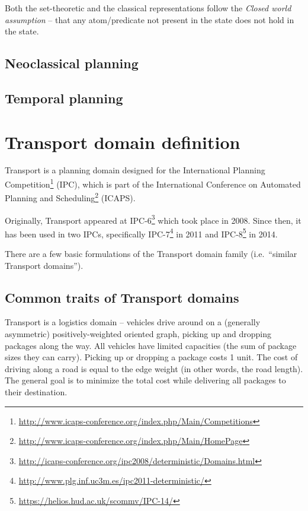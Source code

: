 Both the set-theoretic and the classical representations follow the \textit{Closed world assumption} -- that any atom/predicate not present in the state does not hold in the state.

\subsection{Neoclassical planning}



\subsection{Temporal planning}



\section{Transport domain definition}

Transport is a planning domain designed for
the International Planning
Competition\footnote{\url{http://www.icaps-conference.org/index.php/Main/Competitions}}
(IPC), which is part of the International Conference on Automated Planning and
Scheduling\footnote{\url{http://www.icaps-conference.org/index.php/Main/HomePage}} (ICAPS).

Originally, Transport appeared at 
IPC-6\footnote{\url{http://icaps-conference.org/ipc2008/deterministic/Domains.html}} which took place in 2008.
Since then, it has been used in two IPCs,
specifically IPC-7\footnote{\url{http://www.plg.inf.uc3m.es/ipc2011-deterministic/}} in 2011
and IPC-8\footnote{\url{https://helios.hud.ac.uk/scommv/IPC-14/}} in 2014.

There are a few basic formulations of the Transport domain family (i.e.~``similar Transport domains'').

\subsection{Common traits of Transport domains}

Transport is a logistics domain -- vehicles drive around on a (generally asymmetric) positively-weighted oriented graph, picking up and dropping packages along the way.
All vehicles have limited capacities (the sum of package sizes they can carry).
Picking up or dropping a package costs 1 unit. The cost of driving along a road is equal to the edge weight
(in other words, the road length).
The general goal is to minimize the total cost
while delivering all packages to their destination.

